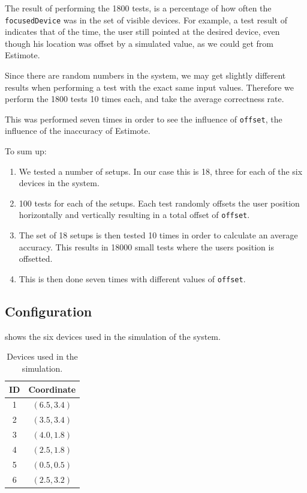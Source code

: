 The result of performing the \num{1800} tests, 
is a percentage of how often the \texttt{focusedDevice} was in the set of visible devices. 
For example, a test result of  indicates that  of the time, 
the user still pointed at the desired device, 
even though his location was offset by a simulated value, 
as we could get from Estimote.

Since there are random numbers in the system, 
we may get slightly different results when performing a test with the exact same input values. 
Therefore we perform the \num{1800} tests \num{10} times each, 
and take the average correctness rate.

This was performed seven times in order to see the influence of \texttt{offset},
\ie the influence of the inaccuracy of Estimote.

To sum up:
\begin{enumerate}
\item We tested a number of setups. In our case this is \num{18}, three for each of the six devices in the system.
\item \num{100} tests for each of the setups. Each test randomly offsets the user position horizontally and vertically resulting in a total offset of \texttt{offset}.
\item The set of \num{18} setups is then tested \num{10} times in order to calculate an average accuracy. This results in \num{18000} small tests where the users position is offsetted.
\item This is then done seven times with different values of \texttt{offset}.
\end{enumerate}

\subsection{Configuration}

 shows the six devices used in the simulation of the system.

\begin{table}[!hbt]
\centering
\caption{Devices used in the simulation.}
\label{tbl:evaluation:system-correctness:devices}
\begin{tabular}{c|c}
\textbf{ID} & \textbf{Coordinate} \\
\hline 
1           & $(6.5, 3.4)$         \\
2           & $(3.5 , 3.4)$       \\
3           & $(4.0 , 1.8)$           \\
4           & $(2.5 , 1.8)$         \\
5           & $(0.5 , 0.5)$         \\
6           & $(2.5 , 3.2)$        
\end{tabular}
\end{table}

